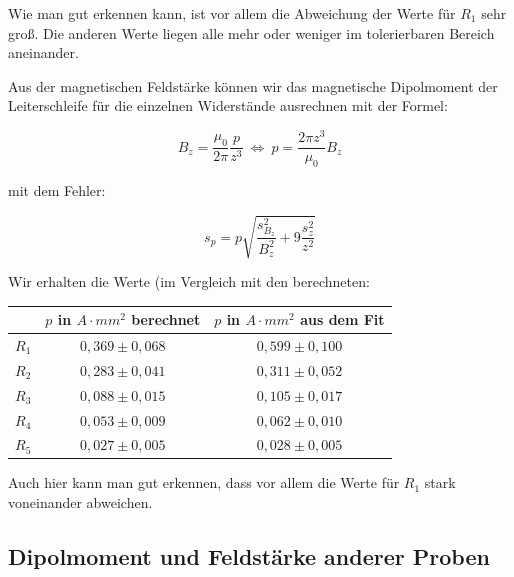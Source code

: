  Wie man gut erkennen kann, ist vor allem die Abweichung der Werte für $R_1$ sehr groß. Die anderen Werte liegen alle mehr oder weniger im tolerierbaren Bereich aneinander.
 
 Aus der magnetischen Feldstärke können wir das magnetische Dipolmoment der Leiterschleife für die einzelnen Widerstände ausrechnen mit der Formel:
 
$$ B_z = \frac{\mu_0}{2\pi}\frac{p}{z^3} \ \Leftrightarrow \  p = \frac{2\pi z^3}{\mu_0}B_z $$

mit dem Fehler:

$$s_p = p\sqrt{\frac{s_{B_z}^2}{B_z^2} + 9\frac{s_z^2}{z^2}}$$

Wir erhalten die Werte (im Vergleich mit den berechneten:

\begin{center}
\begin{tabular}[H]{| c | c | c |} \hline
 & $p$ in $A\cdot mm^2$ berechnet & $p$ in $A\cdot mm^2$ aus dem Fit\\ \hline \hline
 $R_1$ & $0,369 \pm 0,068$ & $0,599\pm 0,100$\\
 $R_2$ & $0,283 \pm 0,041$ & $0,311\pm 0,052$\\
 $R_3$ & $0,088 \pm 0,015$ & $0,105\pm 0,017$\\
 $R_4$ & $0,053 \pm 0,009$ & $0,062\pm 0,010$\\
 $R_5$ & $0,027 \pm 0,005$ & $0,028\pm 0,005$\\ \hline
 \end{tabular}
 \end{center}
 
 Auch hier kann man gut erkennen, dass vor allem die Werte für $R_1$ stark voneinander abweichen.

\subsection{Dipolmoment und Feldstärke anderer Proben}



















